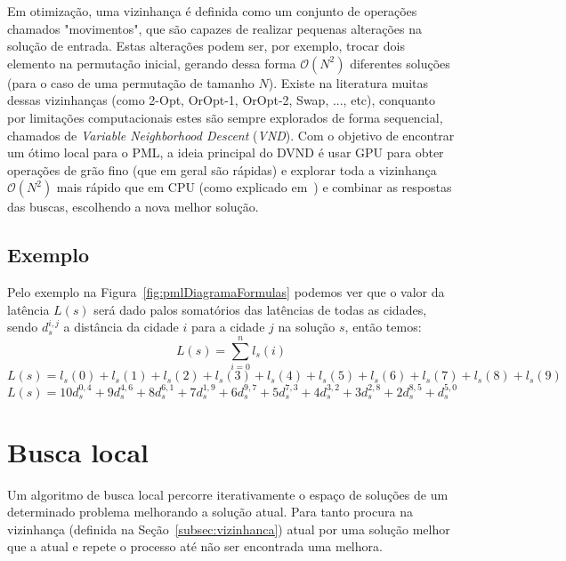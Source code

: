 Em otimização, uma vizinhança é definida como um conjunto de operações chamados "movimentos", que são capazes de realizar pequenas alterações na solução de entrada.
Estas alterações podem ser, por exemplo, trocar dois elemento na permutação inicial, gerando dessa forma $\mathcal{O}(N^2)$ diferentes soluções (para o caso de uma permutação de tamanho $N$). Existe na literatura muitas dessas vizinhanças (como 2-Opt, OrOpt-1, OrOpt-2, Swap, ..., etc), conquanto por limitações computacionais estes são sempre explorados de forma sequencial, chamados de \emph{Variable Neighborhood Descent} (\emph{VND}).
Com o objetivo de encontrar um ótimo local para o PML, a ideia principal do DVND é usar GPU para obter operações de grão fino (que em geral são rápidas) e explorar toda a vizinhança $\mathcal{O}(N^2)$ mais rápido que em CPU (como explicado em~\cite{wamca2016}) e combinar as respostas das buscas, escolhendo a nova melhor solução.

\subsection{Exemplo}


Pelo exemplo na Figura~\ref{fig:pmlDiagramaFormulas} podemos ver que o valor da latência $L(s)$ será dado palos somatórios das latências de todas as cidades, sendo $d_s^{i, j}$ a distância da cidade $i$ para a cidade $j$ na solução $s$, então temos:
$$ L(s) = \sum_{i=0}^n{l_s(i)} $$
$$ L(s) = l_s(0) + l_s(1) + l_s(2) + l_s(3) + l_s(4) + l_s(5) + l_s(6) + l_s(7) + l_s(8) + l_s(9) $$
$$ L(s) = 10d_s^{0, 4} + 9d_s^{4, 6} + 8d_s^{6, 1} + 7d_s^{1, 9} + 6d_s^{9, 7} + 5d_s^{7, 3} + 4d_s^{3, 2} + 3d_s^{2, 8} + 2d_s^{8, 5} + d_s^{5, 0}$$

\section{Busca local} \label{sec:buscaLocal}

Um algoritmo de busca local percorre iterativamente o espaço de soluções de um determinado problema melhorando a solução atual.
Para tanto procura na vizinhança (definida na Seção~\ref{subsec:vizinhanca}) atual por uma solução melhor que a atual e repete o processo até não ser encontrada uma melhora.

